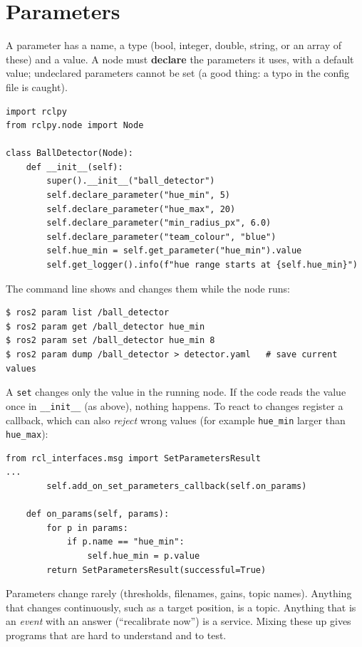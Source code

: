 \section*{Parameters}
A parameter has a name, a type (bool, integer, double, string, or an array of these) and a value. A node must \textbf{declare} the parameters it uses, with a default value; undeclared parameters cannot be set (a good thing: a typo in the config file is caught).
\begin{verbatim}
import rclpy
from rclpy.node import Node

class BallDetector(Node):
    def __init__(self):
        super().__init__("ball_detector")
        self.declare_parameter("hue_min", 5)
        self.declare_parameter("hue_max", 20)
        self.declare_parameter("min_radius_px", 6.0)
        self.declare_parameter("team_colour", "blue")
        self.hue_min = self.get_parameter("hue_min").value
        self.get_logger().info(f"hue range starts at {self.hue_min}")
\end{verbatim}
The command line shows and changes them while the node runs:
\begin{verbatim}
$ ros2 param list /ball_detector
$ ros2 param get /ball_detector hue_min
$ ros2 param set /ball_detector hue_min 8
$ ros2 param dump /ball_detector > detector.yaml   # save current values
\end{verbatim}
A \verb!set! changes only the value in the running node. If the code reads the value once in \verb!__init__! (as above), nothing happens. To react to changes register a callback, which can also \emph{reject} wrong values (for example \verb!hue_min! larger than \verb!hue_max!):
\begin{verbatim}
from rcl_interfaces.msg import SetParametersResult
...
        self.add_on_set_parameters_callback(self.on_params)

    def on_params(self, params):
        for p in params:
            if p.name == "hue_min":
                self.hue_min = p.value
        return SetParametersResult(successful=True)
\end{verbatim}
\begin{keyidea}
Parameters change rarely (thresholds, filenames, gains, topic names). Anything that changes continuously, such as a target position, is a topic. Anything that is an \emph{event} with an answer (``recalibrate now'') is a service. Mixing these up gives programs that are hard to understand and to test.
\end{keyidea}

